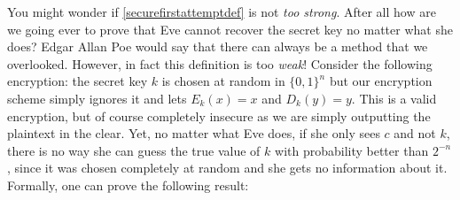 
You might wonder if \cref{securefirstattemptdef} is not \emph{too
strong}. After all how are we going ever to prove that Eve cannot
recover the secret key no matter what she does? Edgar Allan Poe would
say that there can always be a method that we overlooked. However, in
fact this definition is too \emph{weak}! Consider the following
encryption: the secret key \(k\) is chosen at random in \(\{0,1\}^n\)
but our encryption scheme simply ignores it and lets \(E_k(x)=x\) and
\(D_k(y)=y\). This is a valid encryption, but of course completely
insecure as we are simply outputting the plaintext in the clear. Yet, no
matter what Eve does, if she only sees \(c\) and not \(k\), there is no
way she can guess the true value of \(k\) with probability better than
\(2^{-n}\), since it was chosen completely at random and she gets no
information about it. Formally, one can prove the following result:

\hypertarget{trivialsec}{}

